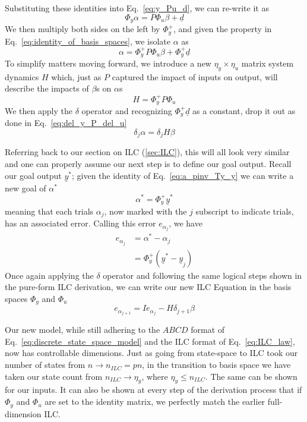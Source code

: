 Substituting these identities into Eq.~\ref{eq:y_Pu_d}, we can re-write it as
\begin{equation}
    \Phi_y \alpha = P\Phi_u \beta + \underline{d}
\end{equation}
We then multiply both sides on the left by $\Phi_y^+$, and given the property in Eq.~\ref{eq:identity_of_basis_spaces}, we isolate $\alpha$ as
\begin{equation}
    \alpha = \Phi_y^+ P\Phi_u \beta + \Phi_y^+ \underline{d}
\end{equation}
To simplify matters moving forward, we introduce a new $\eta_y \times \eta_u$ matrix system dynamics $H$ which, just as $P$ captured the impact of inputs on output, will describe the impacts of $\beta$s on $\alpha$s
\begin{equation}
    H = \Phi_y^+ P\Phi_u
    \label{eq:ilc_basis_H}
\end{equation}
We then apply the $\delta$ operator and recognizing $\Phi_y^+ \underline{d}$ as a constant, drop it out as done in Eq.~\ref{eq:del_y_P_del_u}
\begin{equation}
    \delta_j \alpha = \delta_j H \beta
\end{equation}

Referring back to our section on ILC (\ref{sec:ILC}), this will all look very similar and one can properly assume our next step is to define our goal output. Recall our goal output $\underline{y}^\ast$; given the identity of Eq.~\ref{eq:a_pinv_Ty_y} we can write a new goal of $\alpha^\ast$
\begin{equation}
    \alpha^\ast = \Phi_y^+ \underline{y}^\ast
\end{equation}
meaning that each trials $\alpha_j$, now marked with the $j$ subscript to indicate trials, has an associated error. Calling this error $e_{\alpha_j}$, we have
\begin{align}
    e_{\alpha_j} &= \alpha^\ast - \alpha_j \\
    &= \Phi_y^+ (\underline{y}^\ast - \underline{y}_j)  
\end{align}
Once again applying the $\delta$ operator and following the same logical steps shown in the pure-form ILC derivation, we can write our new ILC Equation in the basis spaces $\Phi_y$ and $\Phi_u$
\begin{equation}
    e_{\alpha_{j+1}} = I e_{\alpha_{j}} - H \delta_{j+1}\beta
\end{equation}

Our new model, while still adhering to the $ABCD$ format of Eq.~\ref{eq:discrete_state_space_model} and the ILC format of Eq.~\ref{eq:ILC_law}, now has controllable dimensions. Just as going from state-space to ILC took our number of states from $n \rightarrow n_{ILC} = pn$, in the transition to basis space we have taken our state count from $n_{ILC} \rightarrow \eta_y$, where $\eta_y \le n_{ILC}$. The same can be shown for our inputs. It can also be shown at every step of the derivation process that if $\Phi_y$ and $\Phi_u$ are set to the identity matrix, we perfectly match the earlier full-dimension ILC.%

